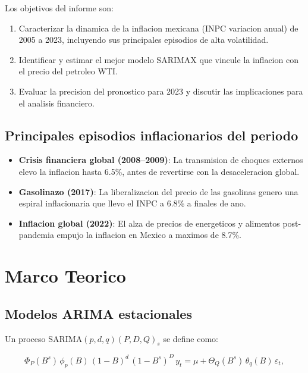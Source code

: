 \documentclass[12pt,a4paper]{article}
\begin{document}
Los objetivos del informe son:
\begin{enumerate}[label=\roman*.]
  \item Caracterizar la dinamica de la inflacion mexicana (INPC variacion anual) de 2005 a 2023, incluyendo sus principales episodios de alta volatilidad.
  \item Identificar y estimar el mejor modelo SARIMAX que vincule la inflacion con el precio del petroleo WTI.
  \item Evaluar la precision del pronostico para 2023 y discutir las implicaciones para el analisis financiero.
\end{enumerate}

\subsection{Principales episodios inflacionarios del periodo}

\begin{itemize}
  \item \textbf{Crisis financiera global (2008--2009)}: La transmision de choques externos elevo la inflacion hasta 6.5\%, antes de revertirse con la desaceleracion global.
  \item \textbf{Gasolinazo (2017)}: La liberalizacion del precio de las gasolinas genero una espiral inflacionaria que llevo el INPC a 6.8\% a finales de ano.
  \item \textbf{Inflacion global (2022)}: El alza de precios de energeticos y alimentos post-pandemia empujo la inflacion en Mexico a maximos de 8.7\%.
\end{itemize}

\section{Marco Teorico}

\subsection{Modelos ARIMA estacionales}

Un proceso SARIMA$(p,d,q)(P,D,Q)_s$ se define como:

\begin{equation}
  \Phi_P(B^s)\,\phi_p(B)\,(1-B)^d\,(1-B^s)^D\,y_t = \mu + \Theta_Q(B^s)\,\theta_q(B)\,\varepsilon_t,
  \label{eq:sarima2}
\end{equation}
\end{document}
